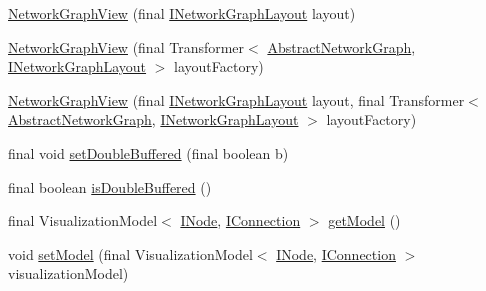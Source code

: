 \begin{DoxyCompactItemize}
\item 
\hyperlink{classedu_1_1kit_1_1trufflehog_1_1view_1_1_network_graph_view_a24ededf86fdd8a0d9d92be75340c698b}{Network\+Graph\+View} (final \hyperlink{interfaceedu_1_1kit_1_1trufflehog_1_1model_1_1graph_1_1_i_network_graph_layout}{I\+Network\+Graph\+Layout} layout)
\item 
\hyperlink{classedu_1_1kit_1_1trufflehog_1_1view_1_1_network_graph_view_a967b68f9e43a6c354cd70c8afc67e70b}{Network\+Graph\+View} (final Transformer$<$ \hyperlink{classedu_1_1kit_1_1trufflehog_1_1model_1_1graph_1_1_abstract_network_graph}{Abstract\+Network\+Graph}, \hyperlink{interfaceedu_1_1kit_1_1trufflehog_1_1model_1_1graph_1_1_i_network_graph_layout}{I\+Network\+Graph\+Layout} $>$ layout\+Factory)
\item 
\hyperlink{classedu_1_1kit_1_1trufflehog_1_1view_1_1_network_graph_view_a4816ce69117d9e14c2b9cbac058ff7a8}{Network\+Graph\+View} (final \hyperlink{interfaceedu_1_1kit_1_1trufflehog_1_1model_1_1graph_1_1_i_network_graph_layout}{I\+Network\+Graph\+Layout} layout, final Transformer$<$ \hyperlink{classedu_1_1kit_1_1trufflehog_1_1model_1_1graph_1_1_abstract_network_graph}{Abstract\+Network\+Graph}, \hyperlink{interfaceedu_1_1kit_1_1trufflehog_1_1model_1_1graph_1_1_i_network_graph_layout}{I\+Network\+Graph\+Layout} $>$ layout\+Factory)
\item 
final void \hyperlink{classedu_1_1kit_1_1trufflehog_1_1view_1_1_network_graph_view_ad59ffcbc893637e4caf56cd74068310e}{set\+Double\+Buffered} (final boolean b)
\item 
final boolean \hyperlink{classedu_1_1kit_1_1trufflehog_1_1view_1_1_network_graph_view_ad1dacd32ad73c99842443af60fd7ddd4}{is\+Double\+Buffered} ()
\item 
final Visualization\+Model$<$ \hyperlink{interfaceedu_1_1kit_1_1trufflehog_1_1model_1_1graph_1_1_i_node}{I\+Node}, \hyperlink{interfaceedu_1_1kit_1_1trufflehog_1_1model_1_1graph_1_1_i_connection}{I\+Connection} $>$ \hyperlink{classedu_1_1kit_1_1trufflehog_1_1view_1_1_network_graph_view_a46621df638863ea27ac36b14d5354dcf}{get\+Model} ()
\item 
void \hyperlink{classedu_1_1kit_1_1trufflehog_1_1view_1_1_network_graph_view_a01ee5fde9bea58654502dc8724c1c3ff}{set\+Model} (final Visualization\+Model$<$ \hyperlink{interfaceedu_1_1kit_1_1trufflehog_1_1model_1_1graph_1_1_i_node}{I\+Node}, \hyperlink{interfaceedu_1_1kit_1_1trufflehog_1_1model_1_1graph_1_1_i_connection}{I\+Connection} $>$ visualization\+Model)

\end{DoxyCompactItemize}
